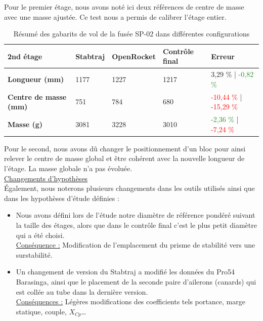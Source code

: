 Pour le premier étage, nous avons noté ici deux références de centre de masse avec une masse ajustée. Ce test nous a permis de calibrer l'étage entier.

\begin{table}[h!]
    \centering
    \begin{tabular}{|l|l|l|l|l|}
        \hline
        \textbf{2nd étage} & \textbf{Stabtraj} & \textbf{OpenRocket} & \textbf{Contrôle final} & \textbf{Erreur} \\
        \hline
        \textbf{Longueur (mm)} & 1177 & 1227 & 1217 & \textcolor{YellowOrange}{3,29 \%}   | \textcolor{ForestGreen}{-0,82 \%}\\
        \hline
        \textbf{Centre de masse (mm)} & 751 & 784 & 680 & \textcolor{Red}{-10,44 \%} | \textcolor{Red}{-15,29 \%}\\
        \hline
        \textbf{Masse (g)} & 3081 & 3228 & 3010 & \textcolor{ForestGreen}{-2,36 \%}  | \textcolor{Red}{-7,24 \%}\\
        \hline
    \end{tabular}
    \caption{Résumé des gabarits de vol de la fusée SP-02 dans différentes configurations}
    \label{tab:gabarits_vol}
\end{table}

Pour le second, nous avons dû changer le positionnement d'un bloc pour ainsi relever le centre de masse global et être cohérent avec la nouvelle longueur de l'étage. La masse globale n'a pas évoluée.\\

\underline{Changements d'hypothèses}\\
Également, nous noterons plusieurs changements dans les outils utilisés ainsi que dans les hypothèses d'étude définies :
\begin{itemize}
    \item Nous avons défini lors de l'étude notre diamètre de référence pondéré suivant la taille des étages, alors que dans le contrôle final c'est le plus petit diamètre qui a été choisi.\\ \underline{Conséquence :} Modification de l'emplacement du prisme de stabilité vers une surstabilité.
    \item Un changement de version du Stabtraj a modifié les données du Pro54 Barasinga, ainsi que le placement de la seconde paire d'ailerons (canards) qui est collée au tube dans la dernière version.\\ \underline{Conséquences :} Légères modifications des coefficients tels portance, marge statique, couple, $X_{Cp}$\ldots
\end{itemize}

\newpage